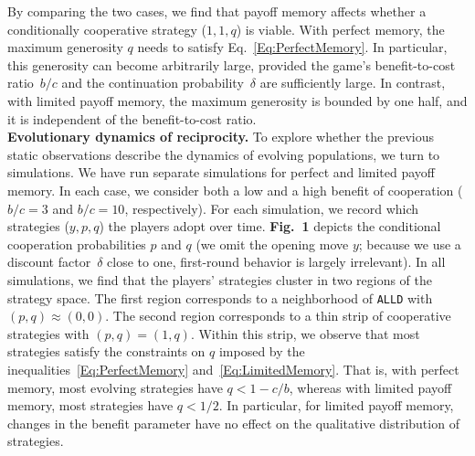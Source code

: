 \documentclass[11pt]{article}
\def\alld{\texttt{ALLD}}
\newcommand{\FigBaseResults}{{\bf Fig.~1}}
\theoremstyle{plainCl1}
\theoremstyle{plainCl2}
\begin{document}

By comparing the two cases, we find that payoff memory affects whether a conditionally cooperative strategy ($1,1,q$) is viable. 
With perfect memory, the maximum generosity $q$ needs to satisfy Eq.~\eqref{Eq:PerfectMemory}.
In particular, this generosity can become arbitrarily large, provided the game's benefit-to-cost ratio~$b/c$ and the continuation probability~$\delta$ are sufficiently large. 
In contrast, with limited payoff memory, the maximum generosity is bounded by one half, and it is independent of the benefit-to-cost ratio.\\



\noindent
{\bf Evolutionary dynamics of reciprocity.}
To explore whether the previous static observations describe the dynamics of evolving populations, we turn to simulations.
We have run separate simulations for perfect and limited payoff memory. 
In each case, we consider both a low and a high benefit of cooperation ($b/c\!=\!3$ and $b/c\!=\!10$, respectively).  
For each simulation, we record which strategies ($y,p,q$) the players adopt over time.
\FigBaseResults{} depicts the conditional cooperation probabilities $p$ and $q$ (we omit the opening move \(y\); because we use a discount factor~\(\delta\) close to one, first-round behavior is largely irrelevant). 
In all simulations, we find that the players' strategies cluster in two regions of the strategy space. 
The first region corresponds to a neighborhood of \alld{} with $(p,q)\!\approx\!(0,0)$.
The second region corresponds to a thin strip of cooperative strategies with $(p,q)\!=\!(1,q)$. 
Within this strip, we observe that most strategies satisfy the constraints on $q$ imposed by the inequalities~\eqref{Eq:PerfectMemory} and~\eqref{Eq:LimitedMemory}. 
That is, with perfect memory, most evolving strategies have $q\!<\!1\!-\!c/b$, whereas with limited payoff memory, most strategies have $q\!<\!1/2$. 
In particular, for limited payoff memory, changes in the benefit parameter have no effect on the qualitative distribution of strategies. 

\end{document}
